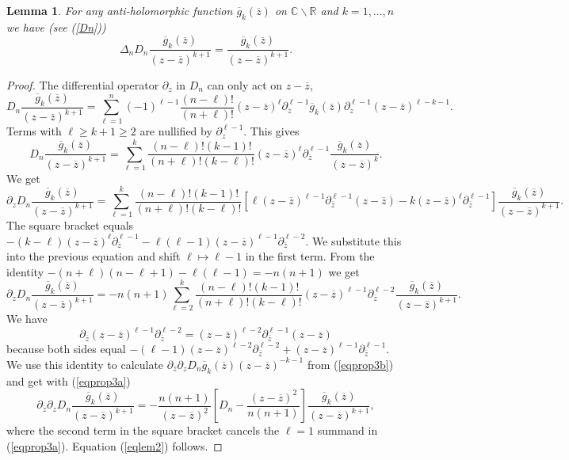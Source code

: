 \documentclass[oneside]{amsart}
\newcommand{\CC}{{\mathbb C}}
\newcommand{\RR}{{\mathbb R}}
\newcommand{\gggg}{{\overline{g}}}
\newcommand{\zz}{{\overline{z}}}
\theoremstyle{plain}
\newtheorem{lem}[thm]{Lemma}
\begin{document}
\begin{lem}\label{pf2lem3}
For any anti-holomorphic function $\gggg_k(\zz)$ on $\CC\backslash\RR$ and $k=1,\ldots,n$ we have (see (\ref{Dn}))
\begin{equation}\label{eqlem2}
\Delta_nD_n\frac{\gggg_k(\zz)}{(z-\zz)^{k+1}}=\frac{\gggg_k(\zz)}{(z-\zz)^{k+1}}.
\end{equation}
\end{lem}

\begin{proof}
The differential operator $\partial_z$ in $D_n$ can only act on $z-\zz$,
$$
D_n\frac{\gggg_k(\zz)}{(z-\zz)^{k+1}}=\sum_{\ell=1}^n(-1)^{\ell-1}\frac{(n-\ell)!}{(n+\ell)!}(z-\zz)^\ell\partial_\zz^{\ell-1}\gggg_k(\zz)\partial_z^{\ell-1}(z-\zz)^{\ell-k-1}.
$$
Terms with $\ell\geq k+1\geq2$ are nullified by $\partial_z^{\ell-1}$. This gives
\begin{equation}\label{eqprop3a}
D_n\frac{\gggg_k(\zz)}{(z-\zz)^{k+1}}=\sum_{\ell=1}^k\frac{(n-\ell)!(k-1)!}{(n+\ell)!(k-\ell)!}(z-\zz)^\ell\partial_\zz^{\ell-1}\frac{\gggg_k(\zz)}{(z-\zz)^k}.
\end{equation}
We get
$$
\partial_zD_n\frac{\gggg_k(\zz)}{(z-\zz)^{k+1}}=\sum_{\ell=1}^k\frac{(n-\ell)!(k-1)!}{(n+\ell)!(k-\ell)!}
\left[\ell(z-\zz)^{\ell-1}\partial_\zz^{\ell-1}(z-\zz)-k(z-\zz)^\ell\partial_\zz^{\ell-1}\right]\frac{\gggg_k(\zz)}{(z-\zz)^{k+1}}.
$$
The square bracket equals $-(k-\ell)(z-\zz)^\ell\partial_\zz^{\ell-1}-\ell(\ell-1)(z-\zz)^{\ell-1}\partial_\zz^{\ell-2}$.
We substitute this into the previous equation and shift $\ell\mapsto\ell-1$ in the first term. From the identity $-(n+\ell)(n-\ell+1)-\ell(\ell-1)=-n(n+1)$ we get
\begin{equation}\label{eqprop3b}
\partial_zD_n\frac{\gggg_k(\zz)}{(z-\zz)^{k+1}}=-n(n+1)\sum_{\ell=2}^k\frac{(n-\ell)!(k-1)!}{(n+\ell)!(k-\ell)!}(z-\zz)^{\ell-1}\partial_\zz^{\ell-2}\frac{\gggg_k(\zz)}{(z-\zz)^{k+1}}.
\end{equation}
We have
$$
\partial_\zz(z-\zz)^{\ell-1}\partial_\zz^{\ell-2}=(z-\zz)^{\ell-2}\partial_\zz^{\ell-1}(z-\zz)
$$
because both sides equal $-(\ell-1)(z-\zz)^{\ell-2}\partial_\zz^{\ell-2}+(z-\zz)^{\ell-1}\partial_\zz^{\ell-1}$.
We use this identity to calculate $\partial_\zz\partial_zD_n\gggg_k(\zz)(z-\zz)^{-k-1}$ from (\ref{eqprop3b}) and get with (\ref{eqprop3a})
$$
\partial_\zz\partial_zD_n\frac{\gggg_k(\zz)}{(z-\zz)^{k+1}}=-\frac{n(n+1)}{(z-\zz)^2}\left[D_n-\frac{(z-\zz)^2}{n(n+1)}\right]\frac{\gggg_k(\zz)}{(z-\zz)^{k+1}},
$$
where the second term in the square bracket cancels the $\ell=1$ summand in (\ref{eqprop3a}). Equation (\ref{eqlem2}) follows.
\end{proof}
\end{document}

